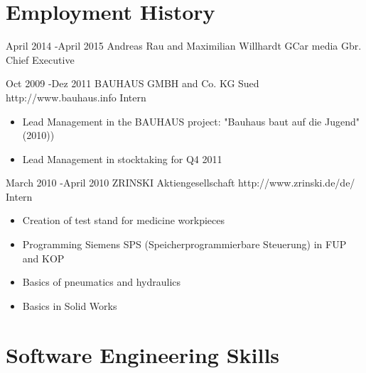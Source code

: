 \documentclass[10pt]{article} %
\begin{document}



\section{Employment History}

\job
{April 2014 -}{April 2015}
{Andreas Rau and Maximilian Willhardt GCar media Gbr.}
{}
{Chief Executive}
{}


\job
{Oct 2009 -}{Dez 2011}
{BAUHAUS GMBH and Co. KG Sued}
{http://www.bauhaus.info}
{Intern}
{
\begin{itemize}
\item{Lead Management in the BAUHAUS project: "Bauhaus baut auf die Jugend" (2010))}
\item{Lead Management in stocktaking for Q4 2011}
\end{itemize}
}



\job
{March 2010 -}{April 2010}
{ZRINSKI Aktiengesellschaft}
{http://www.zrinski.de/de/}
{Intern}
{
\begin{itemize}
\item{Creation of test stand for medicine workpieces}
\item{Programming Siemens SPS (Speicherprogrammierbare Steuerung) in FUP and KOP}
\item{Basics of pneumatics and hydraulics}
\item{Basics in  Solid Works}
\end{itemize}
}



\section{Software Engineering Skills}
\end{document}
